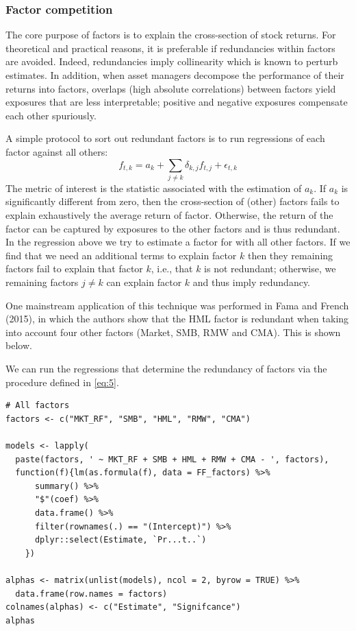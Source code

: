 \subsubsection{Factor competition}
The core purpose of factors is to explain the cross-section of stock returns. For theoretical and practical reasons, it is preferable if redundancies within factors are avoided. Indeed, redundancies imply collinearity which is known to perturb estimates. In addition, when asset managers decompose the performance of their returns into factors, overlaps (high absolute correlations) between factors yield exposures that are less interpretable; positive and negative exposures compensate each other spuriously.

A simple protocol to sort out redundant factors is to run regressions of each factor against all others:
\begin{equation}
    f_{t,k} = a_{k} + \sum_{j \neq k} \delta_{k,j}f_{t,j} + \epsilon_{t,k} \label{eq:5}
\end{equation}
The metric of interest is the statistic associated with the estimation of $a_{k}$. If $a_{k}$ is significantly different from zero, then the cross-section of (other) factors fails to explain exhaustively the average return of factor. Otherwise, the return of the factor can be captured by exposures to the other factors and is thus redundant. In the regression above we try to estimate a factor for with all other factors. If we find that we need an additional terms to explain factor $k$ then they remaining factors fail to explain that factor $k$, i.e., that $k$ is not redundant; otherwise, we remaining factors $j \neq k$ can explain factor $k$ and thus imply redundancy.

One mainstream application of this technique was performed in Fama and French (2015), in which the authors show that the HML factor is redundant when taking into account four other factors (Market, SMB, RMW and CMA). This is shown below. 

We can run the regressions that determine the redundancy of factors via the procedure defined in \eqref{eq:5}.
\begin{lstlisting}
# All factors
factors <- c("MKT_RF", "SMB", "HML", "RMW", "CMA")

models <- lapply(
  paste(factors, ' ~ MKT_RF + SMB + HML + RMW + CMA - ', factors), 
  function(f){lm(as.formula(f), data = FF_factors) %>% 
      summary() %>% 
      "$"(coef) %>% 
      data.frame() %>% 
      filter(rownames(.) == "(Intercept)") %>% 
      dplyr::select(Estimate, `Pr...t..`)
    })

alphas <- matrix(unlist(models), ncol = 2, byrow = TRUE) %>% 
  data.frame(row.names = factors)
colnames(alphas) <- c("Estimate", "Signifcance")
alphas
\end{lstlisting}

